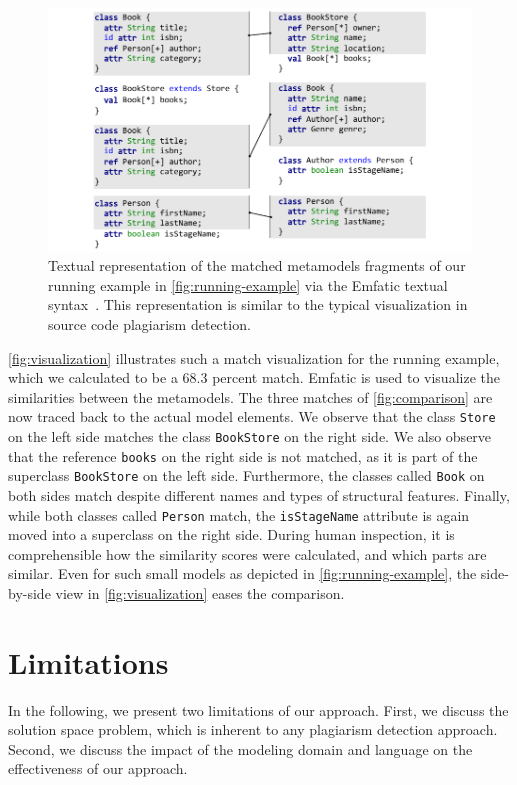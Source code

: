 \begin{figure}
    \centering
    \includegraphics[width=\linewidth]{figures/mde/comparisonView.pdf}
    \caption[Visualization of Detected Modeling Plagiarism]{Textual representation of the matched metamodels fragments of our running example in \autoref{fig:running-example} via the Emfatic textual syntax~\cite{Emfatic}. This representation is similar to the typical visualization in source code plagiarism detection.}
    \label{fig:visualization}
\end{figure}

\autoref{fig:visualization} illustrates such a match visualization for the running example, which we calculated to be a 68.3 percent match. Emfatic is used to visualize the similarities between the metamodels. The three matches of \autoref{fig:comparison} are now traced back to the actual model elements. We observe that the class \texttt{Store} on the left side matches the class \texttt{BookStore} on the right side.
We also observe that the reference \texttt{books} on the right side is not matched, as it is part of the superclass \texttt{BookStore} on the left side. Furthermore, the classes called \texttt{Book} on both sides match despite different names and types of structural features. Finally, while both classes called \texttt{Person} match, the \texttt{isStageName} attribute is again moved into a superclass on the right side.
During human inspection, it is comprehensible how the similarity scores were calculated, and which parts are similar.
Even for such small models as depicted in \autoref{fig:running-example}, the side-by-side view in \autoref{fig:visualization} eases the comparison.


\section{Limitations}\label{sec:mde-limits}
In the following, we present two limitations of our approach.
First, we discuss the solution space problem, which is inherent to any plagiarism detection approach.
Second, we discuss the impact of the modeling domain and language on the effectiveness of our approach.

